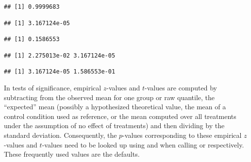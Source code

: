 \documentclass[krantz2]{krantz}\usepackage{knitr}
\begin{document}
\begin{knitrout}\footnotesize
{}\color{fgcolor}\begin{kframe}
\begin{alltt}
\hlstd{(} \hlstd{=} \hlstd{,}  \hlstd{=} \hlstd{,}  \hlstd{=} \hlstd{)}
\end{alltt}
\begin{verbatim}
## [1] 0.9999683
\end{verbatim}
\begin{alltt}
\hlstd{(} \hlstd{=} \hlstd{,}  \hlstd{=} \hlstd{,}  \hlstd{=} \hlstd{,}  \hlstd{=} \hlstd{)}
\end{alltt}
\begin{verbatim}
## [1] 3.167124e-05
\end{verbatim}
\begin{alltt}
\hlstd{(} \hlstd{=} \hlstd{,}  \hlstd{=} \hlstd{,}  \hlstd{=} \hlstd{,}  \hlstd{=} \hlstd{)}
\end{alltt}
\begin{verbatim}
## [1] 0.1586553
\end{verbatim}
\begin{alltt}
\hlstd{(} \hlstd{=} \hlstd{(}\hlstd{,} \hlstd{),}  \hlstd{=} \hlstd{,}  \hlstd{=} \hlstd{,}  \hlstd{=} \hlstd{)}
\end{alltt}
\begin{verbatim}
## [1] 2.275013e-02 3.167124e-05
\end{verbatim}
\begin{alltt}
\hlstd{(} \hlstd{=} \hlstd{,}  \hlstd{=} \hlstd{,}  \hlstd{=} \hlstd{(}\hlstd{,} \hlstd{),}  \hlstd{=} \hlstd{)}
\end{alltt}
\begin{verbatim}
## [1] 3.167124e-05 1.586553e-01
\end{verbatim}
\end{kframe}
\end{knitrout}

\begin{explainbox}
  In tests of significance, empirical $z$-values and $t$-values are computed by subtracting from the observed mean for one group or raw quantile, the ``expected'' mean (possibly a hypothesized theoretical value, the mean of a control condition used as reference, or the mean computed over all treatments under the assumption of no effect of treatments) and then dividing by the standard deviation. Consequently, the $p$-values corresponding to these empirical $z$-values and $t$-values need to be looked up using  and  when calling  or  respectively. These frequently used values are the defaults.
\end{explainbox}
\end{document}
